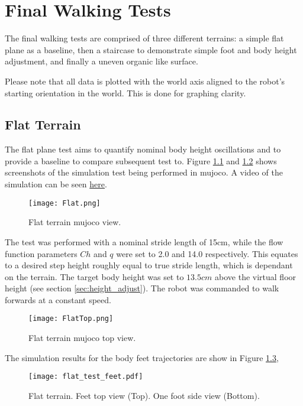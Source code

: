 \chapter{Final Walking Tests}
    The final walking tests are comprised of three different terrains: a simple flat plane as a baseline, then a staircase to demonstrate simple foot and body height adjustment, and finally a uneven organic like surface.

    Please note that all data is plotted with the world axis aligned to the robot's starting orientation in the world. This is done for graphing clarity.
    

    \section{Flat Terrain}
    The flat plane test aims to quantify nominal body height oscillations and to provide a baseline to compare subsequent test to. Figure \ref{fig:plane_test} and \ref{fig:plane_test_top} shows screenshots of the simulation test being performed in \ac{mujoco}. A video of the simulation can be seen \href{https://youtu.be/pw4GzVp-8aQ}{here}.
    \begin{figure}[h]
        \centering
        \texttt{[image: Flat.png]}
        \caption{Flat terrain \ac{mujoco} view.}
        \label{fig:plane_test}
    \end{figure}

    \noindent
    The test was performed with a nominal stride length of 15cm, while the flow function parameters \(Ch\) and \(q\) were set to 2.0 and 14.0 respectively. This equates to a desired step height roughly equal to true stride length, which is dependant on the terrain. The target body height was set to \(13.5cm\) above the virtual floor height (see section \ref{sec:height_adjust}). The robot was commanded to walk forwards at a constant speed.
    \begin{figure}[h]
        \centering
        \texttt{[image: FlatTop.png]}
        \caption{Flat terrain \ac{mujoco} top view.}
        \label{fig:plane_test_top}
    \end{figure}
    
    \noindent
    The simulation results for the body feet trajectories are show in Figure \ref{fig:flat_feet},
    \begin{figure}[h]
        \centering
        \texttt{[image: flat\_test\_feet.pdf]}
        \caption{Flat terrain. Feet top view (Top). One foot side view (Bottom).}
        \label{fig:flat_feet}
    \end{figure}

